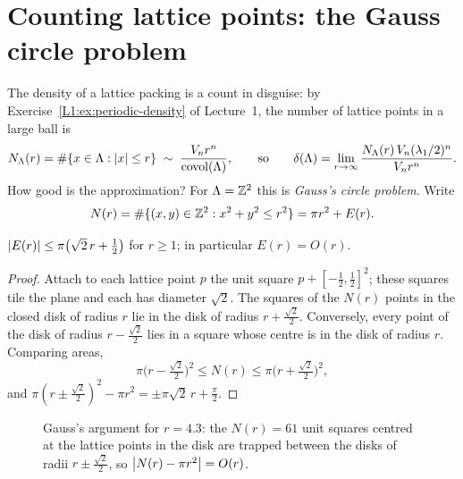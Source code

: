 \section{Counting lattice points: the Gauss circle problem}
\label{NT:sec:circle}

The density of a lattice packing is a count in disguise: by Exercise~\ref{L1:ex:periodic-density} of
Lecture~1, the number of lattice points in a large ball is
\[
  N_\Lambda(r)=\#\{x\in\Lambda:\left\lvert x \right\rvert\le r\}\;\sim\;\frac{V_nr^n}{\operatorname{covol}(\Lambda)},
  \qquad\text{so}\qquad
  \delta(\Lambda)=\lim_{r\to\infty}\frac{N_\Lambda(r)\,V_n(\lambda_1/2)^n}{V_nr^n}.
\]
How good is the approximation? For $\Lambda=\mathbb{Z}^2$ this is \emph{Gauss's circle problem}. Write
\[
  N(r)=\#\{(x,y)\in\mathbb{Z}^2:x^2+y^2\le r^2\}=\pi r^2+E(r).
\]

\begin{proposition}[Gauss]\label{NT:prop:gauss}
$\left\lvert E(r) \right\rvert\le\pi\big(\sqrt2\,r+\tfrac12\big)$ for $r\ge1$; in particular $E(r)=O(r)$.
\end{proposition}

\begin{proof}
Attach to each lattice point $p$ the unit square $p+[-\frac12,\frac12]^2$; these squares tile the plane
and each has diameter $\sqrt2$. The squares of the $N(r)$ points in the closed disk of radius $r$ lie
in the disk of radius $r+\frac{\sqrt2}2$. Conversely, every point of the disk of radius
$r-\frac{\sqrt2}2$ lies in a square whose centre is in the disk of radius $r$. Comparing areas,
\[
  \pi\big(r-\tfrac{\sqrt2}{2}\big)^2\le N(r)\le\pi\big(r+\tfrac{\sqrt2}{2}\big)^2,
\]
and $\pi(r\pm\frac{\sqrt2}2)^2-\pi r^2=\pm\pi\sqrt2\,r+\frac\pi2$.
\end{proof}

\begin{figure}[ht]
\centering
{}
\caption{Gauss's argument for $r=4.3$: the $N(r)=61$ unit squares centred at the lattice points in the
disk are trapped between the disks of radii $r\pm\frac{\sqrt2}{2}$, so $\left\lvert N(r)-\pi r^2 \right\rvert=O(r)$.}
\label{NT:fig:gauss}
\end{figure}

